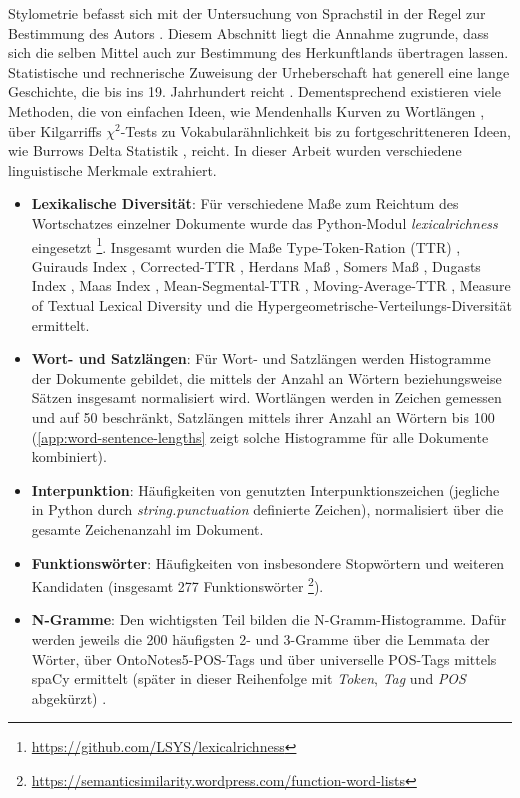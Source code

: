 \documentclass[bachelor,german]{info1thesis}
\begin{document}
Stylometrie befasst sich mit der Untersuchung von Sprachstil in der Regel zur Bestimmung des Autors \cite{Spillner1974}. Diesem Abschnitt liegt die Annahme zugrunde, dass sich die selben Mittel auch zur Bestimmung des Herkunftlands übertragen lassen. Statistische und rechnerische Zuweisung der Urheberschaft hat generell eine lange Geschichte, die bis ins 19. Jahrhundert reicht \cite{Stamatatos2009}. Dementsprechend existieren viele Methoden, die von einfachen Ideen, wie Mendenhalls Kurven zu Wortlängen \cite{Mendenhall1887}, über Kilgarriffs $\chi^2$-Tests zu Vokabularähnlichkeit \cite{Kilgarriff2001} bis zu fortgeschritteneren Ideen, wie Burrows Delta Statistik \cite{Burrows2002}, reicht. In dieser Arbeit wurden verschiedene linguistische Merkmale extrahiert.
\begin{itemize}
\item \textbf{Lexikalische Diversität}: Für verschiedene Maße zum Reichtum des Wortschatzes einzelner Dokumente wurde das Python-Modul \textit{lexicalrichness} eingesetzt \footnote{\url{https://github.com/LSYS/lexicalrichness}}. Insgesamt wurden die Maße Type-Token-Ration (TTR) \cite{Templin1957}, Guirauds Index \cite{Guiraud1954},  Corrected-TTR \cite{Carroll1964}, Herdans Maß \cite{Herdan1964}, Somers Maß \cite{Somers1966}, Dugasts Index \cite{Dugast1978}, Maas Index \cite{Maas1972}, Mean-Segmental-TTR \cite{Torruella2013}, Moving-Average-TTR \cite{Covington2010}, Measure of Textual Lexical Diversity  \cite{McCarthy2010} und die Hypergeometrische-Verteilungs-Diversität \cite{McCarthy2007} ermittelt.
\item \textbf{Wort- und Satzlängen}: Für Wort- und Satzlängen werden Histogramme der Dokumente gebildet, die mittels der Anzahl an Wörtern beziehungsweise Sätzen insgesamt normalisiert wird. Wortlängen werden in Zeichen gemessen und auf 50 beschränkt, Satzlängen mittels ihrer Anzahl an Wörtern bis 100 (\autoref{app:word-sentence-lengths} zeigt solche Histogramme für alle Dokumente kombiniert).
\item \textbf{Interpunktion}: Häufigkeiten von genutzten Interpunktionszeichen (jegliche in Python durch \textit{string.punctuation} definierte Zeichen), normalisiert über die gesamte Zeichenanzahl im Dokument.
\item \textbf{Funktionswörter}: Häufigkeiten von insbesondere Stopwörtern und weiteren Kandidaten (insgesamt 277 Funktionswörter \footnote{\url{https://semanticsimilarity.wordpress.com/function-word-lists}}).
\item \textbf{N-Gramme}: Den wichtigsten Teil bilden die N-Gramm-Histogramme. Dafür werden jeweils die 200 häufigsten 2- und 3-Gramme über die Lemmata der Wörter, über OntoNotes5-POS-Tags und über universelle POS-Tags mittels spaCy ermittelt (später in dieser Reihenfolge mit \textit{Token}, \textit{Tag} und \textit{POS} abgekürzt) \cite{RalphWeischedel2013}.
\end{itemize}
\end{document}
